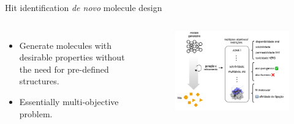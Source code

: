 \documentclass[aspectratio=169,xcolor=dvipsnames]{beamer}
\begin{document}
\begin{frame}{Hit identification \hfill \textit{de novo} molecule design}
    \begin{columns}[c]
        \begin{itemize}
            \item Generate molecules with desirable properties without the need for pre-defined structures.
            \item Essentially multi-objective problem.
        \end{itemize}

        \begin{figure}
            \centering
            \includegraphics[width=.99\linewidth]{imgs/desenho-denovo.png}
        \end{figure}

    \end{columns}
\end{frame}




\end{document}

